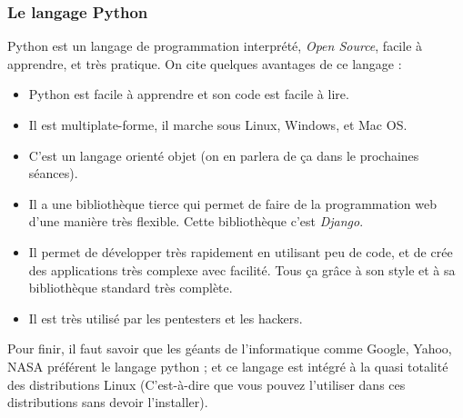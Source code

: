 \documentclass[12pt]{article}
\begin{document}
        \subsubsection{Le langage Python}
            Python est un langage de programmation interprété, \emph{Open Source}, facile à apprendre,
            et très pratique. On cite quelques avantages de ce langage :
            \begin{itemize}
                \item Python est facile à apprendre et son code est facile à lire.
                \item Il est multiplate-forme, il marche sous Linux, Windows, et Mac OS.
                \item C'est un langage orienté objet (on en parlera de ça dans le prochaines séances).
                \item Il a une bibliothèque tierce qui permet de faire de la programmation web d'une manière très flexible.
                    Cette bibliothèque c'est \emph{Django}.
                \item Il permet de développer très rapidement en utilisant peu de code, et de crée des applications
                    très complexe avec facilité. Tous ça grâce à son style et à sa bibliothèque standard très complète.
                \item Il est très utilisé par les pentesters et les hackers.
            \end{itemize}

            Pour finir, il faut savoir que les géants de l'informatique comme Google, Yahoo, NASA préférent le langage
            python ; et ce langage est intégré à la quasi totalité des distributions Linux (C'est-à-dire que vous pouvez l'utiliser
            dans ces distributions sans devoir l'installer).

\end{document}

